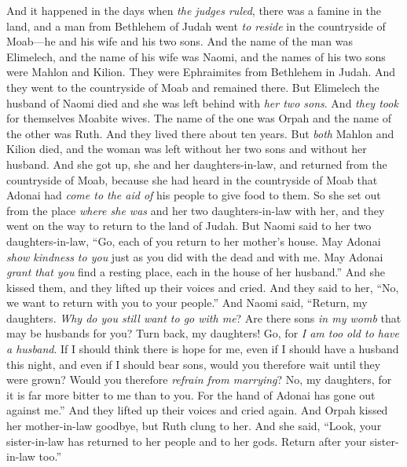 
\begin{biblechapter} %
 And it happened in the days when \textit{the judges ruled}, there was a famine in the land, and a man from Bethlehem of Judah went \textit{to reside} in the countryside of Moab—he and his wife and his two sons.
\verse And the name of the man was Elimelech, and the name of his wife was Naomi, and the names of his two sons were Mahlon and Kilion. They were Ephraimites from Bethlehem in Judah. And they went to the countryside of Moab and remained there.
\verse But Elimelech the husband of Naomi died and she was left behind with \textit{her two sons}.
\verse And \textit{they took} for themselves Moabite wives. The name of the one was Orpah and the name of the other was Ruth. And they lived there about ten years.
\verse But \textit{both} Mahlon and Kilion died, and the woman was left without her two sons and without her husband.
 And she got up, she and her daughters-in-law, and returned from the countryside of Moab, because she had heard in the countryside of Moab that Adonai had \textit{come to the aid of} his people to give food to them.
\verse So she set out from the place \textit{where she was} and her two daughters-in-law with her, and they went on the way to return to the land of Judah.
\verse But Naomi said to her two daughters-in-law, “Go, each of you return to her mother’s house. May Adonai \textit{show kindness to you} just as you did with the dead and with me.
\verse May Adonai \textit{grant that you} find a resting place, each in the house of her husband.” And she kissed them, and they lifted up their voices and cried.
\verse And they said to her, “No, we want to return with you to your people.”
\verse And Naomi said, “Return, my daughters. \textit{Why do you still want to go with me}? Are there sons \textit{in my womb} that may be husbands for you?
\verse Turn back, my daughters! Go, for \textit{I am too old to have a husband}. If I should think there is hope for me, even if I should have a husband this night, and even if I should bear sons,
\verse would you therefore wait until they were grown? Would you therefore \textit{refrain from marrying}? No, my daughters, for it is far more bitter to me than to you. For the hand of Adonai has gone out against me.”
\verse And they lifted up their voices and cried again. And Orpah kissed her mother-in-law goodbye, but Ruth clung to her.
\verse And she said, “Look, your sister-in-law has returned to her people and to her gods. Return after your sister-in-law too.”

\end{biblechapter}
